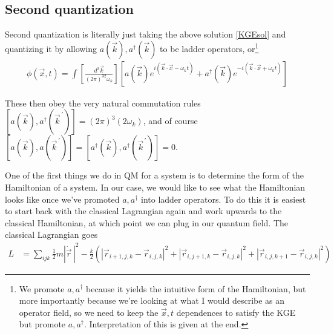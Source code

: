 \documentclass[12pt]{article}
\newcommand{\abs}[1]{\left|#1\right|}
\newcommand{\pvec}[1]{\vec{#1}^{\,\prime}}
\begin{document}
\subsection{Second quantization}

Second quantization is literally just taking the above solution \eqref{KGEsol} and quantizing it by allowing $a(\vec{k}), a^\dagger(\vec{k})$ to be ladder operators, or\footnote{We promote $a, a^\dagger$ because it yields the intuitive form of the Hamiltonian, but more importantly because we're looking at what I would describe as an operator field, so we need to keep the $\vec{x},t$ dependences to satisfy the KGE but promote $a, a^\dagger$. Interpretation of this is given at the end.}
\begin{align}
    \phi(\vec{x},t) = \int \left[ \frac{d^3\vec{k}}{(2\pi)^32\omega_k} \right]\left[ a(\vec{k}) e^{i\left( \vec{k} \cdot \vec{x} - \omega_kt \right)} + a^\dagger(\vec{k}) e^{-i\left( \vec{k} \cdot \vec{x} + \omega_kt \right)} \right]\label{KGEQsol}
\end{align}

These then obey the very natural commutation rules $\left[ a(\vec{k}), a^\dagger(\pvec{k}) \right] = \left( 2\pi \right)^3 (2\omega_k)$, and of course $\left[ a(\vec{k}), a(\pvec{k}) \right] = \left[ a^\dagger(\vec{k}) , a^\dagger(\pvec{k}) \right] = 0$. 

One of the first things we do in QM for a system is to determine the form of the Hamiltonian of a system. In our case, we would like to see what the Hamiltonian looks like once we've promoted $a, a^\dagger$ into ladder operators. To do this it is easiest to start back with the classical Lagrangian again and work upwards to the classical Hamiltonian, at which point we can plug in our quantum field. The classical Lagrangian goes
\begin{align}
    L &= \sum\limits_{ijk}^{}\frac{1}{2}m\abs{\dot{\vec{r}}\,}^2 - \frac{k}{2}\left( \left| \vec{r}_{i+1,j,k} - \vec{r}_{i,j,k}  \right|^2 + \left| \vec{r}_{i,j+1,k} - \vec{r}_{i,j,k}  \right|^2 + \left| \vec{r}_{i,j,k+1} - \vec{r}_{i,j,k}  \right|^2 \right)
\end{align}
\end{document}
